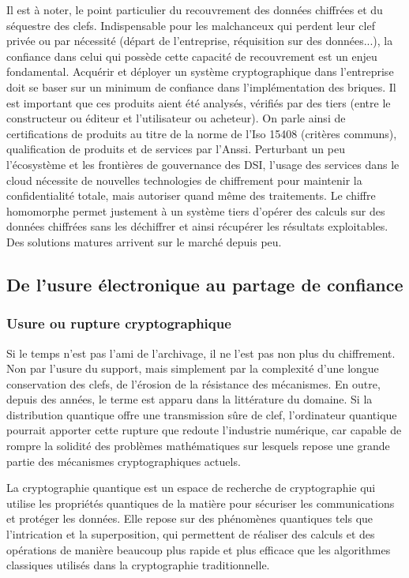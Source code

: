 

 Il est à noter, le point particulier du recouvrement des données chiffrées et du séquestre des clefs. Indispensable pour les malchanceux qui perdent leur clef privée ou par nécessité (départ de l'entreprise, réquisition sur des données...), la confiance dans celui qui possède cette capacité de recouvrement est un enjeu fondamental.
Acquérir et déployer un système cryptographique dans l'entreprise doit se baser sur un minimum de confiance dans
l'implémentation des briques. Il est important que ces produits aient été analysés, vérifiés par des tiers (entre le constructeur ou éditeur et l'utilisateur ou acheteur). On parle ainsi de certifications de produits au titre de la norme de l'Iso 15408 (critères communs), qualification de produits et de services par l'Anssi. Perturbant un peu l'écosystème et les frontières de gouvernance des DSI, l'usage des services dans le cloud nécessite de nouvelles technologies de chiffrement pour maintenir la confidentialité totale, mais autoriser quand même des traitements. Le chiffre homomorphe permet justement à un système tiers d'opérer des calculs sur des données chiffrées sans les déchiffrer et ainsi récupérer les résultats exploitables. Des solutions matures arrivent sur le marché depuis peu.


\subsection{De l'usure électronique au partage de confiance}

\subsubsection{Usure ou rupture cryptographique}
Si le temps n'est pas l'ami de l'archivage, il ne l'est pas non plus du chiffrement. Non par l'usure du support, mais simplement par la complexité d'une longue conservation des clefs, de l'érosion de la résistance des mécanismes. En outre, depuis des années, le terme est apparu dans la littérature du domaine. Si la distribution quantique offre une transmission sûre de clef, l'ordinateur quantique pourrait apporter cette rupture que redoute l'industrie numérique, car capable de rompre la solidité des problèmes mathématiques sur lesquels repose une grande partie des mécanismes cryptographiques actuels.

La cryptographie quantique est un espace de recherche de cryptographie qui utilise les propriétés quantiques de la matière pour sécuriser les communications et protéger les données. Elle repose sur des phénomènes quantiques tels que l'intrication et la superposition, qui permettent de réaliser des calculs et des opérations de manière beaucoup plus rapide et plus efficace que les algorithmes classiques utilisés dans la cryptographie traditionnelle.

